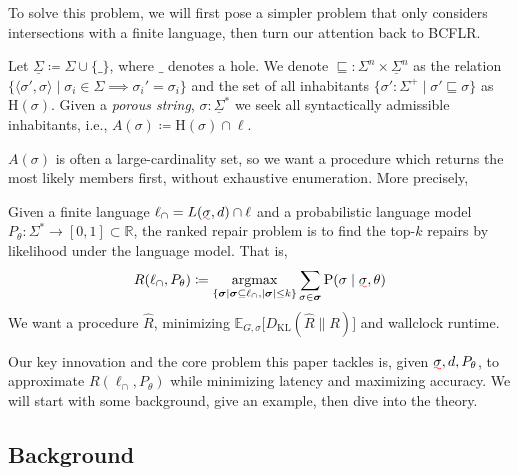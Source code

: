 \documentclass[sigplan,review,anonymous,acmsmall]{acmart}\settopmatter{printfolios=false,printccs=false,printacmref=false}
\begin{document}
  To solve this problem, we will first pose a simpler problem that only considers intersections with a finite language, then turn our attention back to BCFLR.

  \begin{definition}
    Let $\underline\Sigma \coloneqq \Sigma \cup \{\_\}$, where $\_$ denotes a hole. We denote $\sqsubseteq: \Sigma^n \times \underline\Sigma^n$ as the relation $\{\langle\sigma', \sigma\rangle \mid \sigma_i \in \Sigma \implies \sigma_i' = \sigma_i\}$ and the set of all inhabitants $\{\sigma': \Sigma^+ \mid \sigma' \sqsubseteq \sigma\}$ as $\text{H}(\sigma)$. Given a \textit{porous string}, $\sigma: \underline\Sigma^*$ we seek all syntactically admissible inhabitants, i.e., $A(\sigma)\coloneqq\text{H}(\sigma)\cap\ell$.
  \end{definition}

  $A(\sigma)$ is often a large-cardinality set, so we want a procedure which returns the most likely members first, without exhaustive enumeration. More precisely,

  \begin{definition}
    Given a finite language $\ell_\cap = L(\err\sigma, d) \cap \ell$ and a probabilistic language model $P_\theta: \Sigma^* \rightarrow [0, 1] \subset \mathbb{R}$, the ranked repair problem is to find the top-$k$ repairs by likelihood under the language model. That is,
    \begin{equation}
      R(\ell_\cap, P_\theta) \coloneqq \argmax_{\{\bm{\sigma} \mid \bm{\sigma} \subseteq \ell_\cap, |\bm{\sigma}| \leq k\}} \sum_{\sigma \in \bm{\sigma}}\text{P}(\sigma\mid\err\sigma, \theta)
    \end{equation}
    We want a procedure $\hat{R}$, minimizing $\mathbb{E}_{G, \sigma}\big[D_{\text{KL}}(\hat{R} \parallel R)\big]$ and wallclock runtime.
  \end{definition}

  Our key innovation and the core problem this paper tackles is, given $\err\sigma, d, P_\theta$, to approximate $R(\ell_\cap, P_\theta)$ while minimizing latency and maximizing accuracy. We will start with some background, give an example, then dive into the theory.

  \subsection{Background}\label{sec:background}
\end{document}

